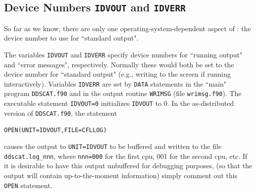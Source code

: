 \subsection{ Device Numbers {\tt IDVOUT} and {\tt IDVERR}
\label{subsec:IDVOUT}}
So far as we know, there are only one operating-system-dependent aspect of
\ddscatv: the device number to use for ``standard output".

The variables {\tt IDVOUT} and {\tt IDVERR} specify device numbers 
for ``running output" and ``error messages", respectively.
Normally these would both be set to the device number
for ``standard output" (e.g., writing to the screen if running interactively).
Variables {\tt IDVERR} are 
set by {\tt DATA} statements in the ``main" program
{\tt DDSCAT.f90} and in the output routine {\tt WRIMSG} (file {\tt wrimsg.f90}).  
The executable statement {\tt IDVOUT=0} initializes {\tt IDVOUT} to
0.  In the as-distributed version of {\tt DDSCAT.f90}, the statement

{\tt OPEN(UNIT=IDVOUT,FILE=CFLLOG)}

\noindent causes the output to {\tt UNIT=IDVOUT} to be buffered
and written to the file {\tt ddscat.log\_nnn}, where {\tt nnn=000} for
the first cpu, 001 for the second cpu, etc.
If it is desirable to have this output unbuffered for debugging purposes,
(so that the output will contain up-to-the-moment information)
simply comment out this {\tt OPEN} statement.

%

